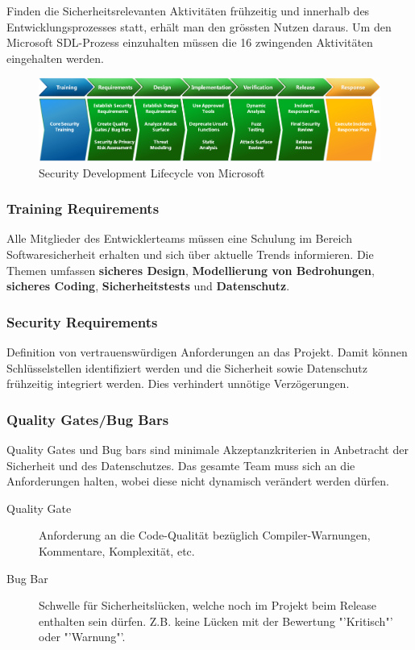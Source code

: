 Finden die Sicherheitsrelevanten Aktivitäten frühzeitig und innerhalb des Entwicklungsprozesses statt, erhält man den grössten Nutzen daraus.
Um den Microsoft SDL-Prozess einzuhalten müssen die 16 zwingenden Aktivitäten eingehalten werden.

\begin{figure}[H]
	\includegraphics[width=\textwidth]{./img/sdl-overview}
	\caption{Security Development Lifecycle von Microsoft}
\end{figure}


\subsubsection{Training Requirements}
Alle Mitglieder des Entwicklerteams müssen eine Schulung im Bereich Softwaresicherheit erhalten und sich über aktuelle Trends informieren. Die Themen umfassen \textbf{sicheres Design}, \textbf{Modellierung von Bedrohungen}, \textbf{sicheres Coding}, \textbf{Sicherheitstests} und \textbf{Datenschutz}.

\subsubsection{Security Requirements}
Definition von vertrauenswürdigen Anforderungen an das Projekt. Damit können Schlüsselstellen identifiziert werden und die Sicherheit sowie Datenschutz frühzeitig integriert werden. Dies verhindert unnötige Verzögerungen.

\subsubsection{Quality Gates/Bug Bars}
Quality Gates und Bug bars sind minimale Akzeptanzkriterien in Anbetracht der Sicherheit und des Datenschutzes. Das gesamte Team muss sich an die Anforderungen halten, wobei diese nicht dynamisch verändert werden dürfen.
\begin{description}
	\item[Quality Gate] Anforderung an die Code-Qualität bezüglich Compiler-Warnungen, Kommentare, Komplexität, etc.
	\item[Bug Bar] Schwelle für Sicherheitslücken, welche noch im Projekt beim Release enthalten sein dürfen. Z.B. keine Lücken mit der Bewertung "'Kritisch"' oder "'Warnung"'.
\end{description}


